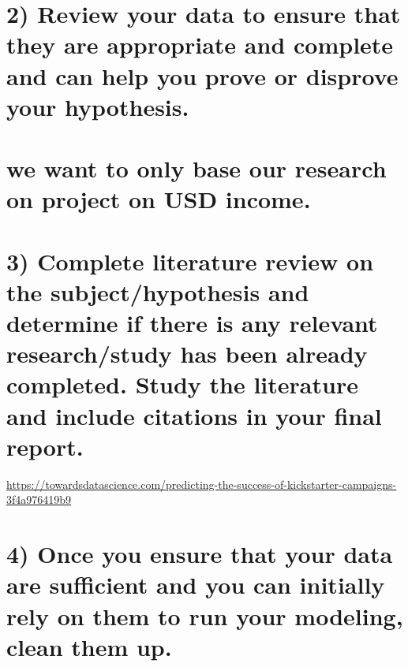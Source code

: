 \documentclass[
]{article}
\newenvironment{Shaded}{\begin{snugshade}}{\end{snugshade}}
\newcommand{\NormalTok}[1]{#1}
\newcommand{\OperatorTok}[1]{\textcolor[rgb]{0.81,0.36,0.00}{\textbf{#1}}}
\newcommand{\StringTok}[1]{\textcolor[rgb]{0.31,0.60,0.02}{#1}}
\begin{document}
\hypertarget{review-your-data-to-ensure-that-they-are-appropriate-and-complete-and-can-help-you-prove-or-disprove-your-hypothesis.}{%
\section{2) Review your data to ensure that they are appropriate and
complete and can help you prove or disprove your
hypothesis.}\label{review-your-data-to-ensure-that-they-are-appropriate-and-complete-and-can-help-you-prove-or-disprove-your-hypothesis.}}

\hypertarget{we-want-to-only-base-our-research-on-project-on-usd-income.}{%
\section{we want to only base our research on project on USD
income.}\label{we-want-to-only-base-our-research-on-project-on-usd-income.}}

\begin{Shaded}
\end{Shaded}

\hypertarget{complete-literature-review-on-the-subjecthypothesis-and-determine-if-there-is-any-relevant-researchstudy-has-been-already-completed.-study-the-literature-and-include-citations-in-your-final-report.}{%
\section{3) Complete literature review on the subject/hypothesis and
determine if there is any relevant research/study has been already
completed. Study the literature and include citations in your final
report.}\label{complete-literature-review-on-the-subjecthypothesis-and-determine-if-there-is-any-relevant-researchstudy-has-been-already-completed.-study-the-literature-and-include-citations-in-your-final-report.}}

\url{https://towardsdatascience.com/predicting-the-success-of-kickstarter-campaigns-3f4a976419b9}

\hypertarget{once-you-ensure-that-your-data-are-sufficient-and-you-can-initially-rely-on-them-to-run-your-modeling-clean-them-up.}{%
\section{4) Once you ensure that your data are sufficient and you can
initially rely on them to run your modeling, clean them
up.}\label{once-you-ensure-that-your-data-are-sufficient-and-you-can-initially-rely-on-them-to-run-your-modeling-clean-them-up.}}
\end{document}
